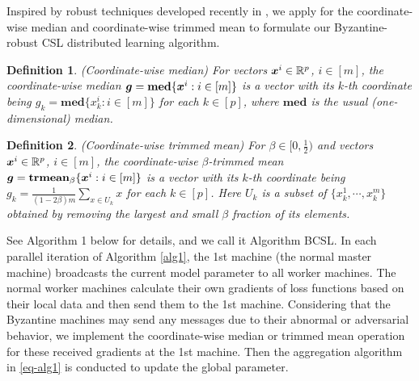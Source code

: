 \documentclass[12pt,a4paper]{article}%
\newtheorem{defi}{Definition}[section]
\newcommand \vc[1]{{\mbox{\boldmath${#1}$}}}
\numberwithin{equation}{section}
\begin{document}
Inspired by  robust techniques developed recently in \cite{YinChenRB2018}, we apply for the coordinate-wise median and coordinate-wise trimmed mean  to formulate our Byzantine-robust CSL distributed learning algorithm.
\begin{defi} (Coordinate-wise median)
For vectors $\vc x^i\in \mathbb{R}^p$, $i\in[m]$, the coordinate-wise median $\vc g=\mathbf{med}\{\vc x^i: i\in [m]\}$ is a vector with its $k$-th coordinate being $g_k=\mathbf{med}\{x_k^i: i\in[m]\}$ for each $k\in[p]$, where $\mathbf{med}$ is the usual (one-dimensional) median.
\end{defi}
\begin{defi} (Coordinate-wise trimmed mean)
For $\beta\in [0, \frac{1}{2})$ and vectors $\vc x^i\in \mathbb{R}^p$, $i\in[m]$, the coordinate-wise $\beta$-trimmed mean $\vc g=\mathbf{trmean}_\beta\{\vc x^i: i\in[m]\}$ is a vector with its $k$-th coordinate being $g_k=\frac{1}{(1-2\beta)m}\sum_{x\in U_k}x$ for each $k\in [p]$. Here $U_k$ is a subset of $\{x_k^1,\cdots,x_k^m\}$ obtained by removing the largest and small $\beta$ fraction of its elements.
\end{defi}
See Algorithm 1 below for details, and we call it Algorithm BCSL.
In each parallel iteration of Algorithm \ref{alg1}, the 1st machine (the normal master machine) broadcasts the current model parameter to all worker machines. The normal worker machines calculate their own gradients of loss functions based on their local data and then send them to the 1st machine. Considering that the Byzantine machines may send any messages due to their abnormal or adversarial behavior,  we implement the coordinate-wise median or trimmed mean operation for these received gradients at the 1st machine. Then
the aggregation  algorithm in \eqref{eq-alg1} is conducted to update the  global parameter.
\end{document}

